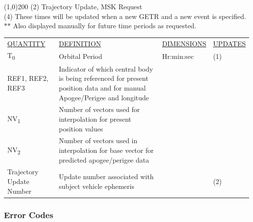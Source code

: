 \documentclass[11pt]{article} %
\begin{document}
\line(1,0){200}
(2) Trajectory Update, MSK Request\\
(4) These times will be updated when a new GETR and a new event is specified.\\
$\ast$$\ast$ Also displayed manually for future time periods as requested.\\
\newpage

\begin{center}
\begin{tabular}{ L{2.9cm} L{4.6cm} L{3cm} L{3.8cm} }
\underline{QUANTITY} & \underline{DEFINITION} & \underline{DIMENSIONS} & \underline{UPDATES} \\
T\textsubscript{0}&Orbital Period&Hr:min:sec&(1)\\
REF1, REF2, REF3&Indicator of which central body is being referenced for present position data and for manual Apogee/Perigee and longitude&&\\
NV\textsubscript{1}&Number of vectors used for interpolation for present position values&&\\
NV\textsubscript{2}&Number of vectors used in interpolation for base vector for predicted apogee/perigee data&&\\
Trajectory Update Number&Update number associated with subject vehicle ephemeris&&(2)\\
\end{tabular}
\end{center}

\subsubsection{Error Codes}
\end{document}
